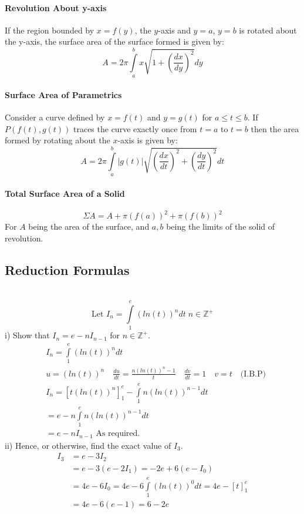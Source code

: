 \documentclass[a4paper,twoside]{article}
\newenvironment{example}[1]{%
	\mbox{}\\\tcolorbox[beamer,breakable,%
		title=Example: #1,standard jigsaw,opacityback=0, colframe=blue!75!black]}{\endtcolorbox\mbox{}\\}
\begin{document}
			\paragraph{Revolution About y-axis} If the region bounded by $x=f(y)$, the $y$-axis and $y=a$, $y=b$ is rotated about the y-axis, the surface area of the surface formed is given by:
			\[
				A=2\pi\int\limits_a^bx\sqrt{1+\left(\frac{dx}{dy}\right)^2}dy
			\]
			
			\paragraph{Surface Area of Parametrics} Consider a curve defined by $x=f(t)$ and $y=g(t)$ for $a\leq t\leq b$. If $P(f(t),g(t))$ traces the curve exactly once from $t=a$ to $t=b$ then the area formed by rotating about the $x$-axis is given by:
			\[
				A=2\pi\int\limits_a^b|g(t)|\sqrt{\left(\frac{dx}{dt}\right)^2+\left(\frac{dy}{dt}\right)^2}dt
			\]
			
			\paragraph{Total Surface Area of a Solid}
			\[
				\Sigma A=A+\pi\left(f(a)\right)^2+\pi\left(f(b)\right)^2
			\]
			For $A$ being the area of the surface, and $a,b$ being the limits of the solid of revolution.
		\subsection{Reduction Formulas}
			\begin{example}{Reduction Formulas Example 1}
				\[
					\text{Let } I_n=\int\limits_{1}^{e}(ln(t))^ndt\;n\in\mathbb{Z}^+
				\]
				i) Show that $I_n=e-nI_{n-1}$ for $n\in\mathbb{Z}^+$.\\
					\begin{align*}
						&I_n=\int\limits_{1}^{e}(ln(t))^ndt \\
						&u=(ln(t))^n \quad \frac{du}{dt}=\frac{n(ln(t))^n-1}{t} \quad \frac{dv}{dt}=1 \quad v=t \quad \text{(I.B.P)} \\
						&I_n=\left[t(ln(t))^n\right]_1^e-\int\limits_1^en(ln(t))^{n-1}dt \\
						&=e-n\int\limits_1^en(ln(t))^{n-1}dt \\
						&=e-nI_{n-1} \text{ As required}.
					\end{align*}
				ii) Hence, or otherwise, find the exact value of $I_3$.\\
					\begin{align*}
						I_3&=e-3I_2\\
						&=e-3(e-2I_1)=-2e+6(e-I_0) \\
						&=4e-6I_0=4e-6\int\limits_1^e(ln(t))^0dt=4e-\left[t\right]^e_1\\
						&=4e-6(e-1)=6-2e
					\end{align*}
			\end{example}
\end{document}
